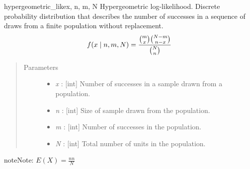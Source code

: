 \hypertarget{pymc.distributions.hypergeometric_like}{}\begin{funcdesc}{hypergeometric\_like}{x, n, m, N}
Hypergeometric log-likelihood. Discrete probability distribution that
describes the number of successes in a sequence of draws from a finite
population without replacement.
\begin{gather}
\begin{split}f(x \mid n, m, N) = \frac{\binom{m}{x}\binom{N-m}{n-x}}{\binom{N}{n}}\end{split}\notag
\end{gather}\begin{quote}\begin{description}
\item[Parameters] \leavevmode\begin{itemize}
\item {} 
\emph{x} : {[}int{]} Number of successes in a sample drawn from a population.

\item {} 
\emph{n} : {[}int{]} Size of sample drawn from the population.

\item {} 
\emph{m} : {[}int{]} Number of successes in the population.

\item {} 
\emph{N} : {[}int{]} Total number of units in the population.

\end{itemize}

\end{description}\end{quote}

\begin{notice}{note}{Note:}
$E(X) = \frac{n n}{N}$
\end{notice}
\end{funcdesc}

